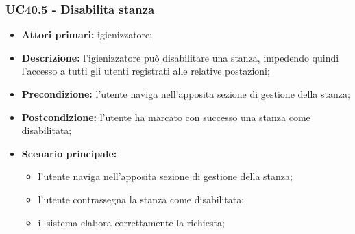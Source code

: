 \subsubsection{UC40.5 - Disabilita stanza}

\begin{itemize}
\item \textbf{Attori primari:} igienizzatore;
\item \textbf{Descrizione:} l’igienizzatore può disabilitare una stanza, impedendo quindi l’accesso a tutti gli utenti registrati alle relative postazioni;
\item \textbf{Precondizione:} l'utente naviga nell’apposita sezione di gestione della stanza; 
\item \textbf{Postcondizione:} l'utente ha marcato con successo una stanza come disabilitata;
\item \textbf{Scenario principale:} 
	\begin{itemize}
		\item l’utente naviga nell’apposita sezione di gestione della stanza;	
		\item l'utente contrassegna la stanza come disabilitata;
		\item il sistema elabora correttamente la richiesta;
	\end{itemize}
\end{itemize}




